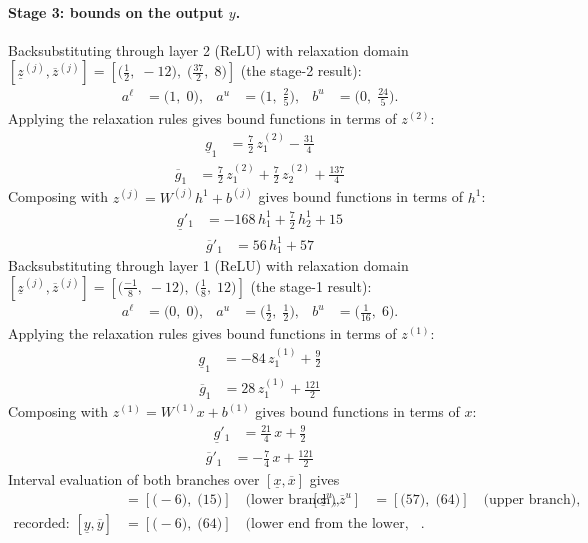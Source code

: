 \documentclass[11pt]{article}
\begin{document}
\paragraph{Stage 3: bounds on the output $y$.}
Backsubstituting through layer 2 (ReLU) with relaxation domain $[\underline{z}^{(j)}, \overline{z}^{(j)}] = [\bigl(\frac{1}{2},\; -12\bigr),\; \bigl(\frac{37}{2},\; 8\bigr)]$ (the stage-2 result):
\begin{align*}
a^{\ell} &= \bigl(1,\; 0\bigr), & a^{u} &= \bigl(1,\; \frac{2}{5}\bigr), & b^{u} &= \bigl(0,\; \frac{24}{5}\bigr).
\end{align*}
Applying the relaxation rules gives bound functions in terms of $z^{(2)}$:
\begin{align*}
\underline{g}_{1} &= \frac{7}{2}\,z^{(2)}_{1} - \frac{31}{4}
\end{align*}
\begin{align*}
\overline{g}_{1} &= \frac{7}{2}\,z^{(2)}_{1} + \frac{7}{2}\,z^{(2)}_{2} + \frac{137}{4}
\end{align*}
Composing with $z^{(j)} = W^{(j)} h^{1} + b^{(j)}$ gives bound functions in terms of $h^{1}$:
\begin{align*}
\underline{g}'_{1} &= -168\,h^{1}_{1} + \frac{7}{2}\,h^{1}_{2} + 15
\end{align*}
\begin{align*}
\overline{g}'_{1} &= 56\,h^{1}_{1} + 57
\end{align*}
Backsubstituting through layer 1 (ReLU) with relaxation domain $[\underline{z}^{(j)}, \overline{z}^{(j)}] = [\bigl(\frac{-1}{8},\; -12\bigr),\; \bigl(\frac{1}{8},\; 12\bigr)]$ (the stage-1 result):
\begin{align*}
a^{\ell} &= \bigl(0,\; 0\bigr), & a^{u} &= \bigl(\frac{1}{2},\; \frac{1}{2}\bigr), & b^{u} &= \bigl(\frac{1}{16},\; 6\bigr).
\end{align*}
Applying the relaxation rules gives bound functions in terms of $z^{(1)}$:
\begin{align*}
\underline{g}_{1} &= -84\,z^{(1)}_{1} + \frac{9}{2}
\end{align*}
\begin{align*}
\overline{g}_{1} &= 28\,z^{(1)}_{1} + \frac{121}{2}
\end{align*}
Composing with $z^{(1)} = W^{(1)} x + b^{(1)}$ gives bound functions in terms of $x$:
\begin{align*}
\underline{g}'_{1} &= \frac{21}{4}\,x + \frac{9}{2}
\end{align*}
\begin{align*}
\overline{g}'_{1} &= -\frac{7}{4}\,x + \frac{121}{2}
\end{align*}
Interval evaluation of both branches over $[\underline{x}, \overline{x}]$ gives
\begin{align*}
[\underline{z}^{\ell}, \overline{z}^{\ell}] &= [\bigl(-6\bigr),\; \bigl(15\bigr)] \quad\text{(lower branch)}, & [\underline{z}^{u}, \overline{z}^{u}] &= [\bigl(57\bigr),\; \bigl(64\bigr)] \quad\text{(upper branch)}, \\
\text{recorded: } [\underline{y}, \overline{y}] &= [\bigl(-6\bigr),\; \bigl(64\bigr)] \quad\text{(lower end from the lower, upper end from the upper branch)}.
\end{align*}
\end{document}
